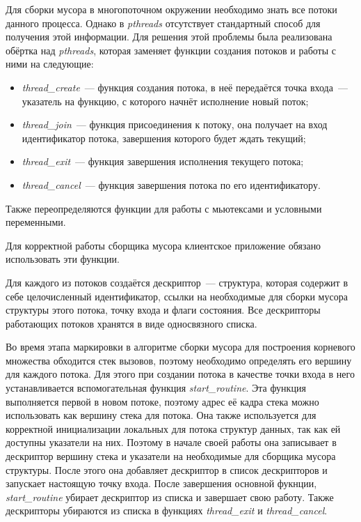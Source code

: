 Для сборки мусора в многопоточном окружении необходимо знать все потоки данного процесса. Однако в \textit{pthreads} отсутствует стандартный способ для получения этой информации.
Для решения этой проблемы была реализована обёртка над \textit{pthreads}, которая заменяет функции создания потоков и работы с ними на следующие:
\begin{itemize}
\item \textit{thread\_create}~--- функция создания потока, в неё передаётся
точка входа~--- указатель на функцию, с которого начнёт исполнение новый поток;
\item \textit{thread\_join}~--- функция присоединения к потоку, она получает на вход идентификатор потока, завершения которого будет ждать текущий;
\item \textit{thread\_exit}~--- функция завершения исполнения текущего потока;
\item \textit{thread\_cancel}~--- функция завершения потока по его идентификатору.
\end{itemize}

Также переопределяются функции для работы с мьютексами и условными переменными.

Для корректной работы сборщика мусора клиентское приложение обязано использовать эти функции.

Для каждого из потоков создаётся дескриптор~--- структура, которая содержит
в себе целочисленный идентификатор, ссылки на необходимые для сборки мусора
структуры этого потока, точку входа и флаги состояния. Все дескрипторы работающих потоков хранятся в виде односвязного списка.

Во время этапа маркировки в алгоритме сборки мусора для построения корневого множества обходится стек вызовов, поэтому необходимо определять его вершину для каждого потока.  Для этого при создании потока в качестве точки входа в него устанавливается вспомогательная функция \textit{start\_routine}. Эта функция выполняется первой в новом потоке, поэтому адрес её кадра стека можно использовать как вершину стека для потока. Она также используется для корректной инициализации локальных для потока структур данных, так как ей доступны указатели на них. Поэтому в начале своей работы она записывает в дескриптор вершину стека и указатели на необходимые для сборщика мусора структуры. После этого она добавляет дескриптор
в список дескрипторов и запускает настоящую точку входа. После завершения основной фукнции, 
 \textit{start\_routine} убирает дескриптор из списка и завершает свою работу.
Также дескрипторы убираются из списка в функциях \textit{thread\_exit} и \textit{thread\_cancel}.

